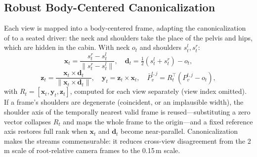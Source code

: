 \documentclass[journal]{IEEEtran}
\begin{document}
\subsection{Robust Body-Centered Canonicalization}
\label{sec:canon}
Each view is mapped into a body-centered frame, adapting the canonicalization of \cite{chen2026canonfuse3d} to a seated driver: the neck and shoulders take the place of the pelvis and hips, which are hidden in the cabin. With neck $o_t$ and shoulders $s^l_t, s^r_t$:
\begin{equation}
\mathbf{x}_t = \frac{s^r_t - s^l_t}{\|s^r_t - s^l_t\|},\quad
\mathbf{d}_t = \tfrac{1}{2}(s^l_t+s^r_t) - o_t,
\end{equation}
\begin{equation}
\mathbf{z}_t = \frac{\mathbf{x}_t \times \mathbf{d}_t}{\|\mathbf{x}_t \times \mathbf{d}_t\|},\quad
\mathbf{y}_t = \mathbf{z}_t \times \mathbf{x}_t,\quad
\bar{P}^{t,j}_v = R_t^\top (P^{t,j}_v - o_t),
\end{equation}
with $R_t = [\mathbf{x}_t, \mathbf{y}_t, \mathbf{z}_t]$, computed for each view separately (view index omitted). If a frame's shoulders are degenerate (coincident, or an implausible width), the shoulder axis of the temporally nearest valid frame is reused---substituting a zero vector collapses $R_t$ and maps the whole frame to the origin---and a fixed reference axis restores full rank when $\mathbf{x}_t$ and $\mathbf{d}_t$ become near-parallel. Canonicalization makes the streams commensurable: it reduces cross-view disagreement from the 2\,m scale of root-relative camera frames to the 0.15\,m scale.
\end{document}
